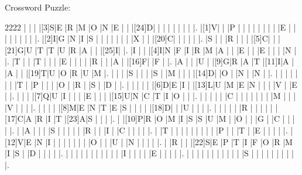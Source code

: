 \documentclass[12pt]{article}
\begin{document}
\begin{center}
  \huge{Crossword Puzzle:}
\end{center}
\vspace{1.5cm}
\begin{Puzzle}{22}{22}
  |{}  |{}  |{}  |[3]S|E   |R   |M   |O   |N   |E   |{}  |{}  |[24]D|{}  |{}  |{}  |{}  |{}  |{}  |{}  |{}  |.
  |[1]V|{}  |{}  |P   |{}  |{}  |{}  |{}  |{}  |{}  |{}  |{}  |E   |{}  |{}  |{}  |{}  |{}  |{}  |{}  |{}  |.
  |[2]I|G   |N   |I   |S   |{}  |{}  |{}  |{}  |{}  |{}  |{}  |X   |{}  |{}  |[20]C|{}  |{}  |{}  |{}  |{}  |.
  |S   |{}  |{}  |R   |{}  |{}  |{}  |[5]C|{}  |{}  |[21]G|U   |T   |T   |U   |R   |A   |{}  |{}  |[25]I|{}  |.
  |I   |{}  |{}  |[4]I|N   |F   |I   |R   |M   |A   |{}  |{}  |E   |{}  |{}  |E   |{}  |{}  |{}  |N   |{}  |.
  |T   |{}  |{}  |T   |{}  |{}  |{}  |E   |{}  |{}  |{}  |{}  |R   |{}  |{}  |A   |{}  |[16]F|{}  |F   |{}  |.
  |A   |{}  |{}  |U   |{}  |[9]G|R   |A   |T   |[11]I|A   |{}  |A   |{}  |{}  |[19]T|U   |O   |R   |U   |M   |.
  |{}  |{}  |{}  |S   |{}  |{}  |{}  |S   |{}  |M   |{}  |{}  |{}  |[14]D|{}  |O   |{}  |N   |{}  |N   |{}  |.
  |{}  |{}  |{}  |{}  |{}  |{}  |{}  |T   |{}  |P   |{}  |{}  |{}  |O   |{}  |R   |{}  |S   |{}  |D   |{}  |.
  |{}  |{}  |{}  |{}  |{}  |[6]D|E   |I   |{}  |[13]L|U   |M   |E   |N   |{}  |{}  |{}  |V   |{}  |E   |{}  |.
  |{}  |{}  |{}  |[7]Q|U   |I   |{}  |{}  |{}  |E   |{}  |{}  |{}  |[15]U|N   |C   |T   |I   |O   |{}  |{}  |.
  |{}  |{}  |{}  |{}  |{}  |C   |{}  |{}  |{}  |{}  |{}  |{}  |{}  |M   |{}  |{}  |{}  |V   |{}  |{}  |{}  |.
  |{}  |{}  |{}  |{}  |[8]M|E   |N   |T   |E   |S   |{}  |{}  |{}  |{}  |[18]D|{}  |{}  |U   |{}  |{}  |{}  |.
  |{}  |{}  |{}  |{}  |{}  |R   |{}  |{}  |{}  |{}  |{}  |[17]C|A   |R   |I   |T   |[23]A|S   |{}  |{}  |{}  |.
  |{}  |[10]P|R   |O   |M   |I   |S   |S   |U   |M   |{}  |O   |{}  |{}  |G   |{}  |C   |{}  |{}  |{}  |{}  |.
  |{}  |A   |{}  |{}  |{}  |S   |{}  |{}  |{}  |{}  |{}  |R   |{}  |{}  |I   |{}  |C   |{}  |{}  |{}  |{}  |.
  |{}  |T   |{}  |{}  |{}  |{}  |{}  |{}  |{}  |{}  |{}  |P   |{}  |{}  |T   |{}  |E   |{}  |{}  |{}  |{}  |.
  |[12]V|E   |N   |I   |{}  |{}  |{}  |{}  |{}  |{}  |{}  |O   |{}  |{}  |U   |{}  |N   |{}  |{}  |{}  |{}  |.
  |{}  |R   |{}  |{}  |[22]S|E   |P   |T   |I   |F   |O   |R   |M   |I   |S   |{}  |D   |{}  |{}  |{}  |{}  |.
  |{}  |{}  |{}  |{}  |{}  |{}  |{}  |{}  |{}  |{}  |{}  |I   |{}  |{}  |{}  |{}  |E   |{}  |{}  |{}  |{}  |.
  |{}  |{}  |{}  |{}  |{}  |{}  |{}  |{}  |{}  |{}  |{}  |S   |{}  |{}  |{}  |{}  |{}  |{}  |{}  |{}  |{}  |.
\end{Puzzle}
\end{document}

